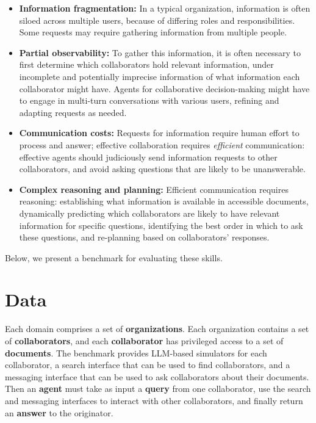 \begin{itemize}


    \item \textbf{Information fragmentation:} 
    In a typical organization, information is often siloed across multiple users, because of differing roles and responsibilities. %
    Some requests may require gathering information from multiple people.

    \item \textbf{Partial observability:} 
    To gather this information, it is often necessary to first determine which collaborators hold relevant information, under incomplete and potentially imprecise information of what information each collaborator might have. Agents for collaborative decision-making might have to engage in multi-turn conversations with various users, refining and adapting requests as needed.
    
    \item \textbf{Communication costs:} Requests for information require human effort to process and answer; effective collaboration requires \emph{efficient} communication: 
    effective agents
    should judiciously send information requests to other collaborators, %
    and avoid asking questions that are likely to be unanswerable.
    
    \item  \textbf{Complex reasoning and planning:} Efficient communication requires reasoning: establishing what information is available in accessible documents, dynamically predicting which collaborators are likely to have relevant information for specific questions, identifying the best order in which to ask these questions, and re-planning based on collaborators' responses.


\end{itemize}
Below, we present a benchmark for evaluating these skills.



\section{Data}
\label{sec:data}


Each \asyncfw{} domain comprises a set of \textbf{organizations}. Each organization contains a set of \textbf{collaborators}, and each \textbf{collaborator} has privileged access to a set of \textbf{documents}. The benchmark provides LLM-based simulators for each collaborator, a search interface that can be used to find collaborators,
and a messaging interface that can be used to ask collaborators about their documents.
Then an \textbf{agent} must take as input a \textbf{query} from one collaborator, use the search and messaging interfaces to interact with other collaborators, and finally return an \textbf{answer} to the originator.

